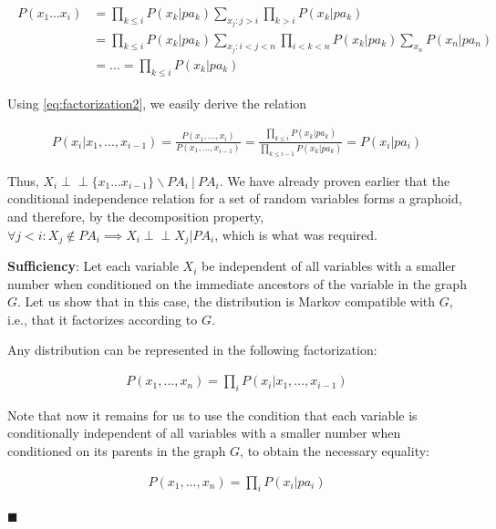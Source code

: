 \documentclass[fleqn]{article}
\newcommand{\independent}{\perp \!\!\! \perp}
\numberwithin{equation}{section}
\numberwithin{theorem}{section}
\numberwithin{figure}{section}
\numberwithin{lemma}{section}
\numberwithin{corollary}{section}
\begin{document}
\begin{align}
	\begin{split}
		P(x_1...x_i) &= \prod\limits_{k\le i}P(x_k|pa_k)\sum\limits_{x_j: j > i}\prod\limits_{k> i} P(x_k | pa_k)\\
		&= \prod\limits_{k\le i}P(x_k|pa_k)\sum\limits_{x_j : i < j < n}\prod\limits_{ i < k < n}P(x_k | pa_k) \sum\limits_{x_n}P(x_n | pa_n)\\
		&= \ldots = \prod\limits_{k\le i}P(x_k|pa_k)
		\label{eq:factorization2}
	\end{split}
\end{align}

Using \ref{eq:factorization2}, we easily derive the relation

\begin{align}
	P(x_i|x_1,...,x_{i-1}) = \frac{P(x_1,...,x_i)}{P(x_1,...,x_{i-1})} = \frac{\prod\limits_{k\le i}P(x_k|pa_k)}{\prod\limits_{k\le i - 1}P(x_k|pa_k)} = P(x_i|pa_i)
\end{align}

Thus, \( X_i \independent \{x_1...x_{i-1}\} \backslash PA_i\ |\ PA_i \). We have already proven earlier that the conditional independence relation for a set of random variables forms a graphoid, and therefore, by the decomposition property, \( \forall j < i: X_j \notin PA_i \implies X_i \independent X_j | PA_i \), which is what was required.

\textbf{Sufficiency}: Let each variable \( X_i \) be independent of all variables with a smaller number when conditioned on the immediate ancestors of the variable in the graph \( G \). Let us show that in this case, the distribution is Markov compatible with \( G \), i.e., that it factorizes according to \( G \).

Any distribution can be represented in the following factorization:

\begin{align}
	P(x_1,...,x_n) = \prod\limits_i P(x_i|x_1,...,x_{i-1})
\end{align}

Note that now it remains for us to use the condition that each variable is conditionally independent of all variables with a smaller number when conditioned on its parents in the graph \( G \), to obtain the necessary equality:

\begin{align}
	P(x_1,...,x_n) = \prod\limits_i P(x_i|pa_i)
\end{align}

\(\blacksquare\)
\end{document}

